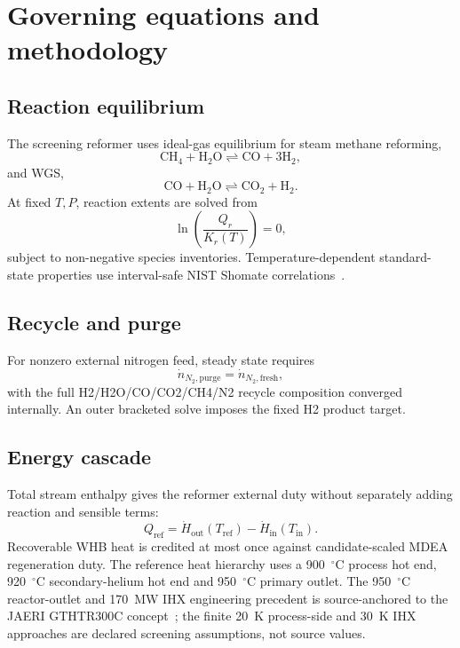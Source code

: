 \section{Governing equations and methodology}
\subsection{Reaction equilibrium}
The screening reformer uses ideal-gas equilibrium for steam methane reforming,
\begin{equation}
\mathrm{CH_4+H_2O\rightleftharpoons CO+3H_2},
\label{eq:smr-reaction}
\end{equation}
and WGS,
\begin{equation}
\mathrm{CO+H_2O\rightleftharpoons CO_2+H_2}.
\label{eq:wgs-reaction}
\end{equation}
At fixed $T,P$, reaction extents are solved from
\begin{equation}
\ln\left(\frac{Q_r}{K_r(T)}\right)=0,
\label{eq:equilibrium-residual}
\end{equation}
subject to non-negative species inventories. Temperature-dependent standard-state properties use interval-safe NIST Shomate correlations~\cite{nistwebbook}.

\subsection{Recycle and purge}
For nonzero external nitrogen feed, steady state requires
\begin{equation}
\dot n_{N_2,\mathrm{purge}}=\dot n_{N_2,\mathrm{fresh}},
\label{eq:n2-purge}
\end{equation}
with the full H2/H2O/CO/CO2/CH4/N2 recycle composition converged internally. An outer bracketed solve imposes the fixed H2 product target.

\subsection{Energy cascade}
Total stream enthalpy gives the reformer external duty without separately adding reaction and sensible terms:
\begin{equation}
Q_{\mathrm{ref}}=\dot H_{\mathrm{out}}(T_{\mathrm{ref}})
-\dot H_{\mathrm{in}}(T_{\mathrm{in}}).
\label{eq:reformer-duty}
\end{equation}
Recoverable WHB heat is credited at most once against candidate-scaled MDEA regeneration duty. The reference heat hierarchy uses a 900~$^\circ$C process hot end, 920~$^\circ$C secondary-helium hot end and 950~$^\circ$C primary outlet. The 950~$^\circ$C reactor-outlet and 170~MW IHX engineering precedent is source-anchored to the JAERI GTHTR300C concept~\cite{jaeri2004gthtr300c}; the finite 20~K process-side and 30~K IHX approaches are declared screening assumptions, not source values.


